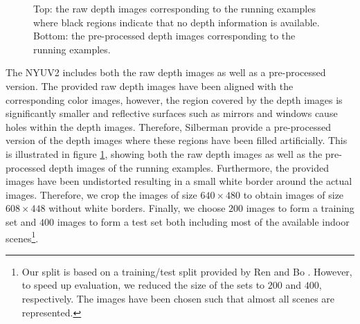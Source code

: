 \begin{figure}[t]
{	}
	\caption[The raw depth mages as well as the pre-processed depth images from the running examples as provided by the NYU Depth Dataset \cite{SilbermanHoiemKohliFergus:2012}.]{Top: the raw depth images corresponding to the running examples where black regions indicate that no depth information is available. Bottom: the pre-processed depth images corresponding to the running examples.}
	\label{fig:datasets-nyu-depth-dataset-depth}
\end{figure}

The NYUV2 includes both the raw depth images as well as a pre-processed version. The provided raw depth images have been aligned with the corresponding color images, however, the region covered by the depth images is significantly smaller and reflective surfaces such as mirrors and windows cause holes within the depth images. Therefore, Silberman \etal provide a pre-processed version of the depth images where these regions have been filled artificially. This is illustrated in figure \ref{fig:datasets-nyu-depth-dataset-depth}, showing both the raw depth images as well as the pre-processed depth images of the running examples. Furthermore, the provided images have been undistorted resulting in a small white border around the actual images. Therefore, we crop the images of size $640 \times 480$ to obtain images of size $608 \times 448$ without white borders. Finally, we choose $200$ images to form a training set and $400$ images to form a test set both including most of the available indoor scenes\footnote{Our split is based on a training/test split provided by Ren and Bo \cite{RenBo:2012}. However, to speed up evaluation, we reduced the size of the sets to $200$ and $400$, respectively. The images have been chosen such that almost all scenes are represented.}.


